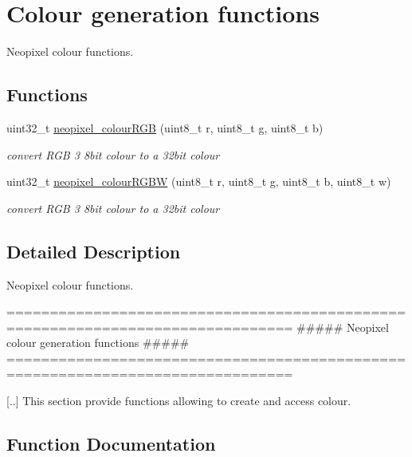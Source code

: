 \hypertarget{group___colour}{}\section{Colour generation functions}
\label{group___colour}


Neopixel colour functions.  


\subsection*{Functions}
\begin{DoxyCompactItemize}
\item 
uint32\+\_\+t \hyperlink{group___colour_ga1d500fbcbecad76feef8835437687ca0}{neopixel\+\_\+colour\+R\+GB} (uint8\+\_\+t r, uint8\+\_\+t g, uint8\+\_\+t b)
\begin{DoxyCompactList}\small\item\em convert R\+GB 3 8bit colour to a 32bit colour \end{DoxyCompactList}\item 
uint32\+\_\+t \hyperlink{group___colour_ga527ba03b45a249e5e1ea1da4b971b3ac}{neopixel\+\_\+colour\+R\+G\+BW} (uint8\+\_\+t r, uint8\+\_\+t g, uint8\+\_\+t b, uint8\+\_\+t w)
\begin{DoxyCompactList}\small\item\em convert R\+GB 3 8bit colour to a 32bit colour \end{DoxyCompactList}\end{DoxyCompactItemize}


\subsection{Detailed Description}
Neopixel colour functions. 

\begin{DoxyVerb} ===============================================================================
                 ##### Neopixel colour generation functions #####
 ===============================================================================

 [..] This section provide functions allowing to create and access colour.\end{DoxyVerb}
 

\subsection{Function Documentation}
\mbox{\label{group___colour_ga1d500fbcbecad76feef8835437687ca0}} 
